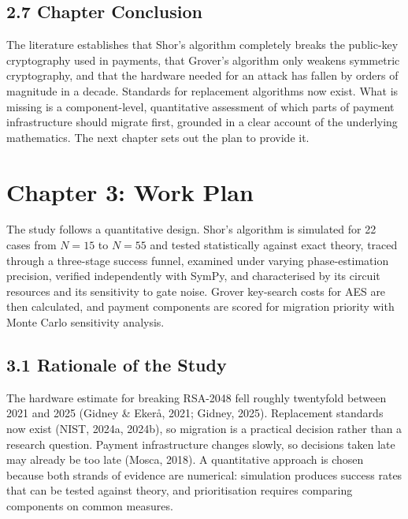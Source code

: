 \documentclass[12pt,oneside]{report}
\begin{document}
\subsection*{2.7 Chapter Conclusion}

The literature establishes that Shor's algorithm completely breaks the public-key cryptography used in payments, that Grover's algorithm only weakens symmetric cryptography, and that the hardware needed for an attack has fallen by orders of magnitude in a decade. Standards for replacement algorithms now exist. What is missing is a component-level, quantitative assessment of which parts of payment infrastructure should migrate first, grounded in a clear account of the underlying mathematics. The next chapter sets out the plan to provide it.
\par

\newpage
\section*{Chapter 3: Work Plan}

The study follows a quantitative design. Shor's algorithm is simulated for 22 cases from $N = 15$ to $N = 55$ and tested statistically against exact theory, traced through a three-stage success funnel, examined under varying phase-estimation precision, verified independently with SymPy, and characterised by its circuit resources and its sensitivity to gate noise. Grover key-search costs for AES are then calculated, and payment components are scored for migration priority with Monte Carlo sensitivity analysis.
\par

\subsection*{3.1 Rationale of the Study}

The hardware estimate for breaking RSA-2048 fell roughly twentyfold between 2021 and 2025 (Gidney \& Ekerå, 2021; Gidney, 2025). Replacement standards now exist (NIST, 2024a, 2024b), so migration is a practical decision rather than a research question. Payment infrastructure changes slowly, so decisions taken late may already be too late (Mosca, 2018). A quantitative approach is chosen because both strands of evidence are numerical: simulation produces success rates that can be tested against theory, and prioritisation requires comparing components on common measures.
\par
\end{document}
